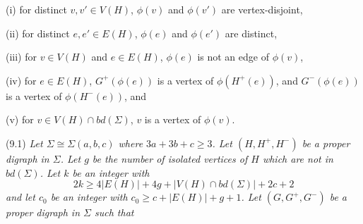 \hspace*{12pt}(i) for distinct $v, v' \in V(H)$, $\phi(v)$ and $\phi(v')$ are vertex-disjoint,

\hspace*{12pt}(ii) for distinct $e, e' \in E(H)$, $\phi(e)$ and $\phi(e')$ are distinct,

\hspace*{12pt}(iii) for $v \in V(H)$ and $e \in E(H)$, $\phi(e)$ is not an edge of $\phi(v)$,

\hspace*{12pt}(iv) for $e \in E(H)$, $G^+(\phi(e))$ is a vertex of $\phi(H^+(e))$, and $G^-(\phi(e))$ is a vertex of $\phi(H^-(e))$, and

\hspace*{12pt}(v) for $v \in V(H) \cap bd(\Sigma)$, $v$ is a vertex of $\phi(v)$.

\stmt
(9.1) \textit{Let $\Sigma \cong \Sigma(a, b, c)$ where $3a + 3b + c \ge 3$. Let $(H, H^+, H^-)$ be a proper digraph in $\Sigma$. Let $g$ be the number of isolated vertices of $H$ which are not in $bd(\Sigma)$. Let $k$ be an integer with}
\begin{equation*}
2k \ge 4|E(H)| + 4g + |V(H) \cap bd(\Sigma)| + 2c + 2
\end{equation*}
\textit{and let $c_0$ be an integer with $c_0 \ge c + |E(H)| + g + 1$. Let $(G, G^+, G^-)$ be a proper digraph in $\Sigma$ such that}

